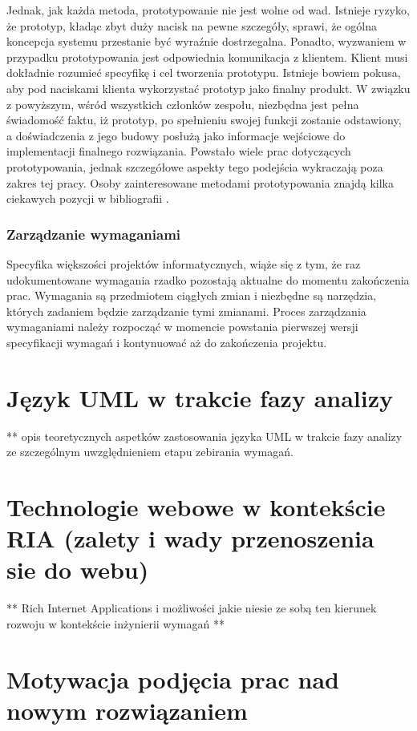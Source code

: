         Jednak, jak każda metoda, prototypowanie nie jest wolne od wad. Istnieje ryzyko, że prototyp, kładąc zbyt duży nacisk na pewne szczegóły, sprawi, że ogólna koncepcja systemu przestanie być wyraźnie dostrzegalna. Ponadto, wyzwaniem w przypadku prototypowania jest odpowiednia komunikacja z klientem. Klient musi dokładnie rozumieć specyfikę i cel tworzenia prototypu. Istnieje bowiem pokusa, aby pod naciskami klienta wykorzystać prototyp jako finalny produkt. W związku z powyższym, wśród wszystkich członków zespołu, niezbędna jest pełna świadomość faktu, iż prototyp, po spełnieniu swojej funkcji zostanie odstawiony, a doświadczenia z jego budowy posłużą jako informacje wejściowe do implementacji finalnego rozwiązania. Powstało wiele prac dotyczących prototypowania, jednak szczegółowe aspekty tego podejścia wykraczają poza zakres tej pracy. Osoby zainteresowane metodami prototypowania znajdą kilka ciekawych pozycji w bibliografii \cite{arnowitz2006effective, budde1992prototyping}.

      \subsubsection{Zarządzanie wymaganiami}

        Specyfika większości projektów informatycznych, wiąże się z tym, że raz udokumentowane wymagania rzadko pozostają aktualne do momentu zakończenia prac. Wymagania są przedmiotem ciągłych zmian i niezbędne są narzędzia, których zadaniem będzie zarządzanie tymi zmianami. Proces zarządzania wymaganiami należy rozpocząć w momencie powstania pierwszej wersji specyfikacji wymagań i kontynuować aż do zakończenia projektu.

  \section{Język UML w trakcie fazy analizy}
    ** opis teoretycznych aspetków zastosowania języka UML w trakcie fazy analizy ze szczególnym uwzględnieniem etapu zebirania wymagań.    


  \section{Technologie webowe w kontekście RIA (zalety i wady przenoszenia sie do webu)}
    ** Rich Internet Applications i możliwości jakie niesie ze sobą ten kierunek rozwoju w kontekście inżynierii wymagań **


  \section{Motywacja podjęcia prac nad nowym rozwiązaniem}

